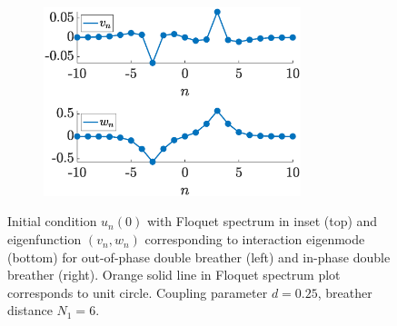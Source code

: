 \documentclass[12pt,reqno]{amsart}
\theoremstyle{definition}
\begin{document}
\begin{figure}
\begin{center}
	\begin{subfigure}{0.45\linewidth}
		\caption{}
		\includegraphics[width=7.5cm]{doubleppinteig.eps}
		\label{fig:doubled}
	\end{subfigure}
	\end{center}
	\caption{Initial condition $u_n(0)$ with Floquet spectrum in inset (top) and eigenfunction $(v_n, w_n)$ corresponding to interaction eigenmode (bottom) for out-of-phase double breather (left) and in-phase double breather (right). Orange solid line in Floquet spectrum plot corresponds to unit circle. Coupling parameter $d = 0.25$, breather distance $N_1 = 6$.}
	\label{fig:double}
\end{figure}
\end{document}
